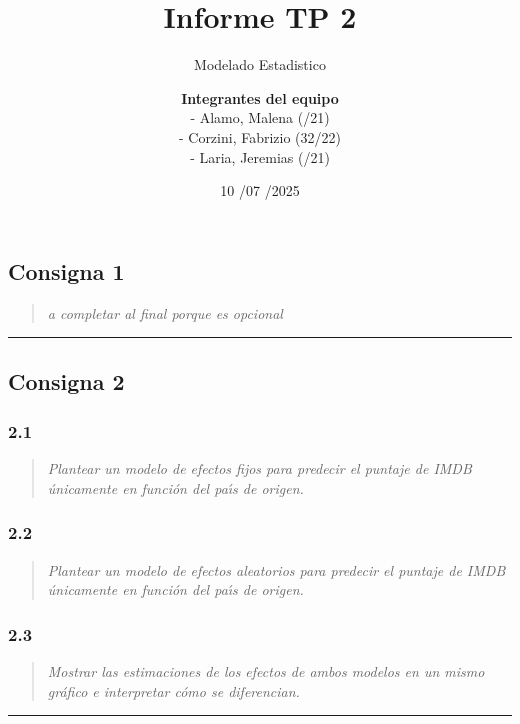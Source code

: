 \documentclass[
]{article}
\title{Informe TP 2}
\subtitle{Modelado Estadistico}
\author{\textbf{Integrantes del equipo}\\
- Alamo, Malena (/21)\\
- Corzini, Fabrizio (32/22)\\
- Laria, Jeremias (/21)}
\date{10 /07 /2025}
\begin{document}
\maketitle

\subsection{Consigna 1}\label{consigna-1}

\begin{quote}
\emph{a completar al final porque es opcional}
\end{quote}

\begin{center}\rule{0.5\linewidth}{0.5pt}\end{center}

\subsection{Consigna 2}\label{consigna-2}

\subsubsection{2.1}\label{section}

\begin{quote}
\emph{Plantear un modelo de efectos fijos para predecir el puntaje de
IMDB únicamente en función del paı́s de origen.}
\end{quote}

\subsubsection{2.2}\label{section-1}

\begin{quote}
\emph{Plantear un modelo de efectos aleatorios para predecir el puntaje
de IMDB únicamente en función del paı́s de origen.}
\end{quote}

\subsubsection{2.3}\label{section-2}

\begin{quote}
\emph{Mostrar las estimaciones de los efectos de ambos modelos en un
mismo gráfico e interpretar cómo se diferencian.}
\end{quote}

\begin{center}\rule{0.5\linewidth}{0.5pt}\end{center}
\end{document}
